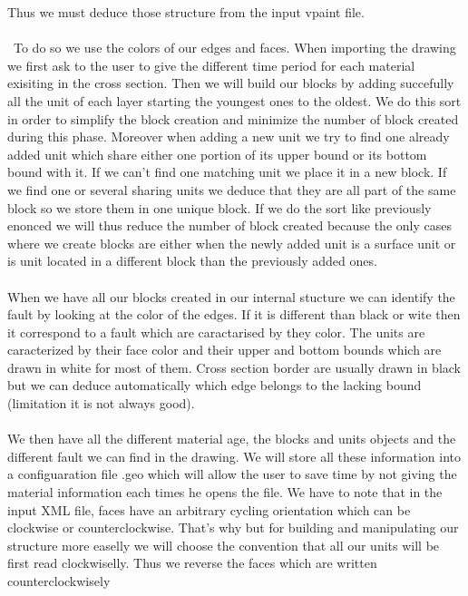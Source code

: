 \documentclass[12pt, a4paper]{memoir} %
\begin{document}
Thus we must deduce those structure from the input vpaint file. \\\\\
To do so we use the colors of our edges and faces. When importing the drawing we first ask to the user to give the different time period for each material exisiting in the cross section. Then we will build our blocks by adding succefully all the unit of each layer starting the youngest ones to the oldest. We do this sort in order to simplify the block creation and minimize the number of block created during this phase. Moreover when adding a new unit we try to find one already added unit which share either one portion of its upper bound  or its bottom bound with it. If we can't find one matching unit we place it in a new block. If we find one or several sharing units we deduce that they are all part of the same block so we store them in one unique block. If we do the sort like previously enonced we will thus reduce the number of block created because the only cases where we create blocks are either when the newly added unit is a surface unit or is unit located in a different block than the previously added ones.\\\\

When we have all our blocks created in our internal stucture we can identify the fault by looking at the color of the edges. If it is different than black or wite then it correspond to a fault which are caractarised by they color. The units are caracterized by their face color and their upper and bottom bounds which are drawn in white for most of them. Cross section border are usually drawn in black but we can deduce automatically which edge belongs to the lacking bound (limitation it is not always good).\\\\

We then have all the different material age, the blocks and units objects and the different fault we can find in the drawing. We will store all these information into a configuaration file .geo which will allow the user to save time by not giving the material information each times he opens the file. We have to note that in the input XML file, faces have an arbitrary cycling orientation which can be clockwise or counterclockwise. That's why but for building and manipulating our structure more easelly we will choose the convention that all our units will be first read clockwiselly. Thus we reverse the faces which are written counterclockwisely\\\\
\end{document}
